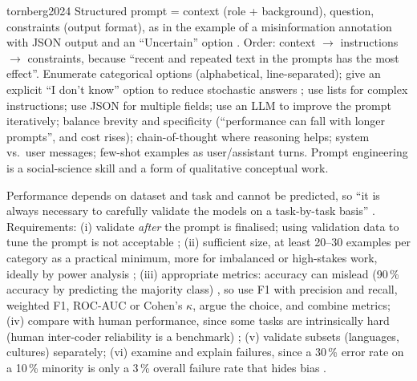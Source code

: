 \begin{papercard}{tornberg2024}
 Structured prompt = context (role + background), question, constraints (output format), as in the example of a misinformation annotation with JSON output and an ``Uncertain'' option . Order: context $\to$ instructions $\to$ constraints, because ``recent and repeated text in the prompts has the most effect''. Enumerate categorical options (alphabetical, line-separated); give an explicit ``I don't know'' option to reduce stochastic answers ; use lists for complex instructions; use JSON for multiple fields; use an LLM to improve the prompt iteratively; balance brevity and specificity (``performance can fall with longer prompts'', and cost rises); chain-of-thought where reasoning helps; system vs.\ user messages; few-shot examples as user/assistant turns. Prompt engineering is a social-science skill and a form of qualitative conceptual work.

 Performance depends on dataset and task and cannot be predicted, so ``it is always necessary to carefully validate the models on a task-by-task basis'' . Requirements: (i) validate \emph{after} the prompt is finalised; using validation data to tune the prompt is not acceptable ; (ii) sufficient size, at least 20--30 examples per category as a practical minimum, more for imbalanced or high-stakes work, ideally by power analysis ; (iii) appropriate metrics: accuracy can mislead (90\,\% accuracy by predicting the majority class) , so use F1 with precision and recall, weighted F1, ROC-AUC or Cohen's $\kappa$, argue the choice, and combine metrics; (iv) compare with human performance, since some tasks are intrinsically hard (human inter-coder reliability is a benchmark) ; (v) validate subsets (languages, cultures) separately; (vi) examine and explain failures, since a 30\,\% error rate on a 10\,\% minority is only a 3\,\% overall failure rate that hides bias .


\end{papercard}
